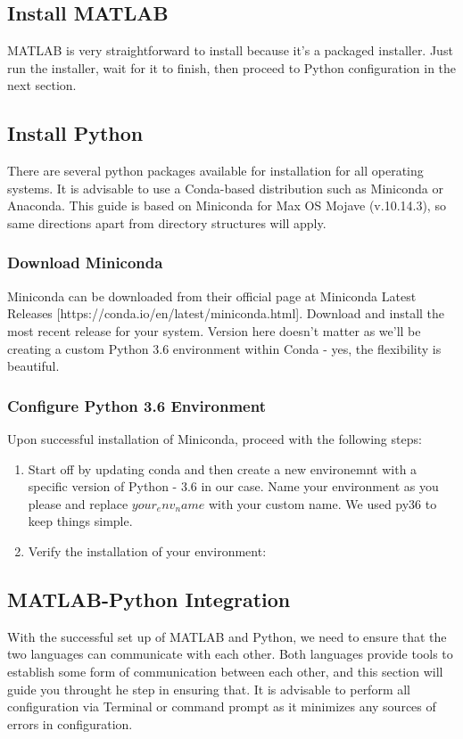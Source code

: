 \documentclass[12pt]{sop}
\begin{document}
\subsection{Install MATLAB}
MATLAB is very straightforward to install because it's a packaged installer. Just run the installer, wait for it to finish, then proceed to Python configuration in the next section.

\subsection{Install Python}
There are several python packages available for installation for all operating systems. It is advisable to use a Conda-based distribution such as Miniconda or Anaconda. This guide is based on Miniconda for Max OS Mojave (v.10.14.3), so same directions apart from directory structures will apply.

\subsubsection{Download Miniconda}
Miniconda can be downloaded from their official page at Miniconda Latest Releases [https://conda.io/en/latest/miniconda.html]. Download and install the most recent release for your system. Version here doesn't matter as we'll be creating a custom Python 3.6 environment within Conda - yes, the flexibility is beautiful.

\subsubsection{Configure Python 3.6 Environment}
Upon successful installation of Miniconda, proceed with the following steps:

\begin{enumerate}
\item Start off by updating conda and then create a new environemnt with a specific version of Python - 3.6 in our case. Name your environment as you please and replace $your_env_name$ with your custom name. We used py36 to keep things simple.
\item Verify the installation of your environment:
\end{enumerate}

\subsection{MATLAB-Python Integration}
With the successful set up of MATLAB and Python, we need to ensure that the two languages can communicate with each other. Both languages provide tools to establish some form of communication between each other, and this section will guide you throught he step in ensuring that. It is advisable to perform all configuration via Terminal or command prompt as it minimizes any sources of errors in configuration.
\end{document}
